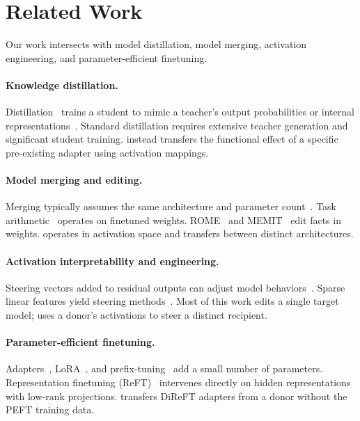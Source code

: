 
\section{Related Work}
\label{sec-related}
Our work intersects with model distillation, model merging, activation engineering, and parameter-efficient finetuning.

\paragraph{Knowledge distillation.}
Distillation~\cite{hinton2015,bucilua2006} trains a student to mimic a teacher's output probabilities or internal representations~\cite{romero2014}.
Standard distillation requires extensive teacher generation and significant student training.
\cmdv{} instead transfers the functional effect of a specific pre-existing adapter using activation mappings.

\paragraph{Model merging and editing.}
Merging typically assumes the same architecture and parameter count~\cite{wortsman2022,matena2022,yadav2023}.
Task arithmetic~\cite{ilharco2022} operates on finetuned weights.
ROME~\cite{meng2022rome} and MEMIT~\cite{meng2022memit} edit facts in weights.
\cmdv{} operates in activation space and transfers between distinct architectures.

\paragraph{Activation interpretability and engineering.}
Steering vectors added to residual outputs can adjust model behaviors~\cite{turner2023,zou2023repre,rimsky2024}.
Sparse linear features yield steering methods~\cite{gao2024,luo2024}.
Most of this work edits a single target model; \cmdv{} uses a donor's activations to steer a distinct recipient.

\paragraph{Parameter-efficient finetuning.}
Adapters~\cite{houlsby2019}, LoRA~\cite{hu2022lora}, and prefix-tuning~\cite{li2021prefix} add a small number of parameters.
Representation finetuning (ReFT)~\cite{wu2024reft} intervenes directly on hidden representations with low-rank projections.
\cmdv{} transfers DiReFT adapters from a donor without the PEFT training data.

